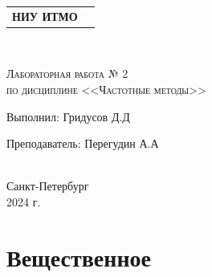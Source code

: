


\begin{titlepage}
  \newpage
  \begin{center}
  \begin{tabular}{cc}
       \parbox{12cm}{\centering \textbf{НИУ ИТМО}}\\
       \\
       \hline
       \hline
  \end{tabular}
  \end{center}

  \begin{center}
  \\ 
  \end{center}
  
  \vspace{1cm}
  
  \begin{center}
      \textsc{Лабораторная работа № 2\\ по дисциплине <<Частотные методы>>}
  \end{center}
  
  \vspace{8em}
  
  \noindent Выполнил:  \hfill Гридусов Д.Д
  
  \vspace{20pt}
  \noindent Преподаватель: \hfill Перегудин А.А \\
  \\
  \vfill
  \begin{center}
  Санкт-Петербург \\2024 г.
  \end{center}
  
  \end{titlepage}
  
  \tableofcontents
  \newpage
  \section{Вещественное}
